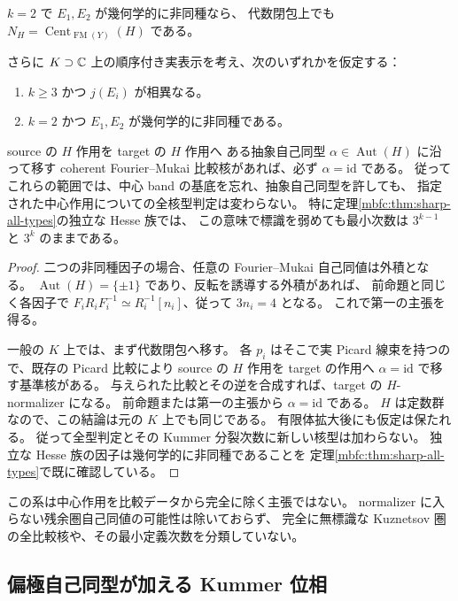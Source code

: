 \begin{corollary}[二つの非同種因子と体上の位相下界]
\label{mbfc:cor:normalizer-bound}
$k=2$ で $E_1,E_2$ が幾何学的に非同種なら、
代数閉包上でも $N_H=\operatorname{Cent}_{\operatorname{FM}(Y)}(H)$ である。

さらに $K\supset\mathbb C$ 上の順序付き実表示を考え、次のいずれかを仮定する：
\begin{enumerate}
 \item $k\ge3$ かつ $j(E_i)$ が相異なる。
 \item $k=2$ かつ $E_1,E_2$ が幾何学的に非同種である。
\end{enumerate}
source の $H$ 作用を target の $H$ 作用へ
ある抽象自己同型 $\alpha\in\operatorname{Aut}(H)$ に沿って移す
coherent Fourier--Mukai 比較核があれば、必ず $\alpha=\mathrm{id}$ である。
従ってこれらの範囲では、中心 band の基底を忘れ、抽象自己同型を許しても、
指定された中心作用についての全核型判定は変わらない。
特に定理\ref{mbfc:thm:sharp-all-types}の独立な Hesse 族では、
この意味で標識を弱めても最小次数は $3^{k-1}$ と $3^k$ のままである。
\end{corollary}
\begin{proof}
二つの非同種因子の場合、任意の Fourier--Mukai 自己同値は外積となる。
$\operatorname{Aut}(H)=\{\pm1\}$ であり、反転を誘導する外積があれば、
前命題と同じく各因子で
$F_iR_iF_i^{-1}\simeq R_i^{-1}[n_i]$、従って $3n_i=4$ となる。
これで第一の主張を得る。

一般の $K$ 上では、まず代数閉包へ移す。
各 $p_i$ はそこで実 Picard 線束を持つので、既存の Picard 比較により
source の $H$ 作用を target の作用へ $\alpha=\mathrm{id}$ で移す基準核がある。
与えられた比較とその逆を合成すれば、target の $H$-normalizer になる。
前命題または第一の主張から $\alpha=\mathrm{id}$ である。
$H$ は定数群なので、この結論は元の $K$ 上でも同じである。
有限体拡大後にも仮定は保たれる。
従って全型判定とその Kummer 分裂次数に新しい核型は加わらない。
独立な Hesse 族の因子は幾何学的に非同種であることを
定理\ref{mbfc:thm:sharp-all-types}で既に確認している。
\end{proof}

この系は中心作用を比較データから完全に除く主張ではない。
normalizer に入らない残余圏自己同値の可能性は除いておらず、
完全に無標識な Kuznetsov 圏の全比較核や、その最小定義次数を分類していない。

\subsection{偏極自己同型が加える Kummer 位相}

